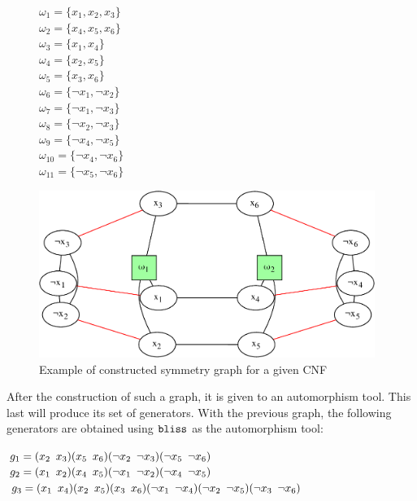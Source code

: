 \begin{figure}[!htbp]
 \begin{minipage}[r]{.2\textwidth}
   $\omega_{1} = \{ x_{1}, x_{2}, x_{3} \}$ \\
 $\omega_{2} = \{ x_{4}, x_{5}, x_{6} \}$ \\
 $\omega_{3} = \{ x_{1}, x_{4} \}$ \\
 $\omega_{4} = \{ x_{2}, x_{5} \}$ \\
 $\omega_{5} = \{ x_{3}, x_{6} \}$ \\
 $\omega_{6} = \{ \neg x_{1}, \neg x_{2} \}$ \\
 $\omega_{7} = \{ \neg x_{1}, \neg x_{3} \}$ \\
 $\omega_{8} = \{ \neg x_{2}, \neg x_{3} \}$ \\
 $\omega_{9} = \{ \neg x_{4}, \neg x_{5} \}$ \\
 $\omega_{10} = \{ \neg x_{4}, \neg x_{6} \}$ \\
 $\omega_{11} = \{ \neg x_{5}, \neg x_{6} \}$ \\
 \end{minipage}
 \begin{minipage}[r]{.75\textwidth}
  \includegraphics[width=4.3in]{cnfs/graph_cnf_opt-crop}
 \end{minipage}
 \caption{Example of constructed symmetry graph for a given CNF}
  \label{fig:graph_opt}
\end{figure}

After the construction of such a graph, it is given to an automorphism tool.
This last will produce its set of generators.
With the previous graph, the following generators are obtained using $\texttt{bliss}$ as the automorphism tool:
\begin{center}
 \begin{minipage}[c]{.635\textwidth}
  $g_1 = (x_2 \enskip x_3)(x_5 \enskip x_6)(\neg x_2 \enskip \neg x_3)(\neg x_5 \enskip \neg x_6)$\\
  $g_2 = (x_1 \enskip x_2)(x_4 \enskip x_5)(\neg x_1 \enskip \neg x_2)(\neg x_4 \enskip \neg x_5)$\\
  $g_3 = (x_1 \enskip x_4)(x_2 \enskip x_5)(x_3 \enskip x_6)(\neg x_1 \enskip \neg x_4)(\neg x_2 \enskip \neg x_5)(\neg x_3 \enskip \neg x_6)$
 \end{minipage}
\end{center}
 
